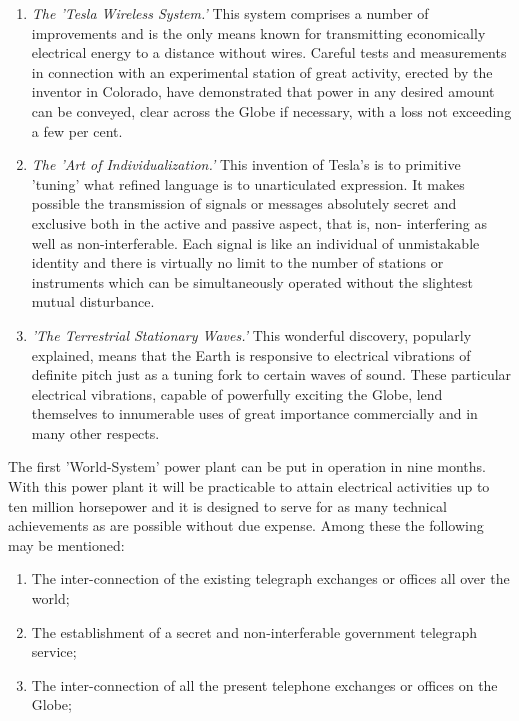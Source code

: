 \documentclass[a4paper,12pt,english,twoside,openright]{memoir}
\begin{document}
{\begin{enumerate}[1.]
\item \emph{The 'Tesla Wireless System.'} This system comprises a number of improvements and is the 
only means known for transmitting economically electrical energy to a distance without wires.  
Careful tests and measurements in connection with an experimental station of great activity, 
erected by the inventor in Colorado, have demonstrated that power in any desired amount can be 
conveyed, clear across the Globe if necessary, with a loss not exceeding a few per cent.

\item \emph{The 'Art of Individualization.'} This invention of Tesla's is to primitive 'tuning' what refined 
language is to unarticulated expression.  It makes possible the transmission of signals or 
messages absolutely secret and exclusive both in the active and passive aspect, that is, non-
interfering as well as non-interferable.  Each signal is like an individual of unmistakable identity 
and there is virtually no limit to the number of stations or instruments which can be 
simultaneously operated without the slightest mutual disturbance.

\item \emph{'The Terrestrial Stationary Waves.'} This wonderful discovery, popularly explained, means that 
the Earth is responsive to electrical vibrations of definite pitch just as a tuning fork to certain 
waves of sound.  These particular electrical vibrations, capable of powerfully exciting the Globe, 
lend themselves to innumerable uses of great importance commercially and in many other 
respects.
\end{enumerate}

The first 'World-System' power plant can be put in operation in nine months.  With this power 
plant it will be practicable to attain electrical activities up to ten million horsepower and it is 
designed to serve for as many technical achievements as are possible without due expense.  
Among these the following may be mentioned:
\begin{enumerate}[(1)]
\item The inter-connection of the existing telegraph exchanges or offices all over the world;

\item The establishment of a secret and non-interferable government telegraph service;

\item The inter-connection of all the present telephone exchanges or offices on the Globe;


\end{enumerate}}
\end{document}
